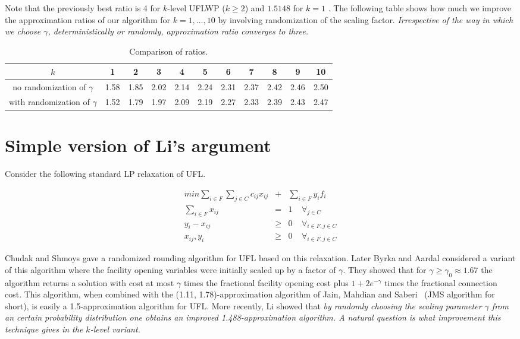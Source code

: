 \documentclass{llncs}
\newcommand{\va}[1]{{\color{black}\sl  #1}}
\begin{document}
Note that the previously best ratio is 4 for $k$-level UFLWP ($k\geq 2$) \cite{Asadi} and $1.5148$ for $k=1$  \cite{YuLi}. The following table shows how much we improve the approximation ratios of our algorithm for $k = 1, \dots, 10$ by involving randomization of the scaling factor. \va{Irrespective of the way in which we choose $\gamma$, deterministically or randomly, approximation ratio converges to three.}
\begin{table}
\centering
  \begin{tabular}{ c | c | c | c | c | c | c | c | c | c | c }
    $k$ & 1 & 2 & 3 & 4 & 5 & 6 & 7 & 8 & 9 & 10 \\ \hline
    no randomization of $\gamma$ & 1.58 & 1.85 & 2.02 & 2.14 & 2.24 & 2.31 & 2.37 & 2.42 & 2.46 & 2.50 \\ \hline
    with randomization of $\gamma$ & 1.52 & 1.79 & 1.97 & 2.09 & 2.19 & 2.27 &2.33 & 2.39 & 2.43 & 2.47 \\
  \end{tabular}
  \caption{Comparison of ratios.}
  \label{improved_ratios}
\end{table}

\section{Simple version of Li's argument}

Consider the following standard LP relaxation of UFL.

\begin{eqnarray}
\label{lp_ufl:goal}
  min \sum_{i \in F}{\sum_{j \in C} {c_{ij}x_{ij}}} &+& \sum_{i \in F} y_i f_i\\
\label{lp_ufl:connected}
  \sum_{i \in F} x_{ij}&=& 1 ~~~~~\forall_{j \in C}\\
y_i - x_{ij}&\geq& 0 ~~~~~\forall_{i \in F, j \in C} \\
x_{ij}, y_{i} &\geq& 0 ~~~~~\forall_{i \in F, j \in C}
\end{eqnarray}

Chudak and Shmoys \cite{Chudak} gave a randomized rounding algorithm for UFL based on this relaxation. Later
Byrka and Aardal \cite{Byrka} considered a variant of this algorithm where the facility opening variables were initially scaled up by a factor of $\gamma$. They showed that
for $\gamma \geq \gamma_0 \approx 1.67$ the algorithm returns a solution with cost at most $\gamma$ times the fractional facility opening cost plus $1+2e^{-\gamma}$ times the fractional connection cost. 
This algorithm, when combined with the (1.11, 1.78)-approximation algorithm of Jain, Mahdian and Saberi~\cite{Jain} (JMS algorithm for short), 
is easily a 1.5-approximation algorithm for UFL. More recently, Li \cite{ShiLi} showed that 
\va{by randomly choosing the scaling parameter $\gamma$ from an certain probability distribution one obtains an improved 1.488-approximation algorithm. 
A natural question is what improvement this technique gives in the $k$-level variant.}
\end{document}
